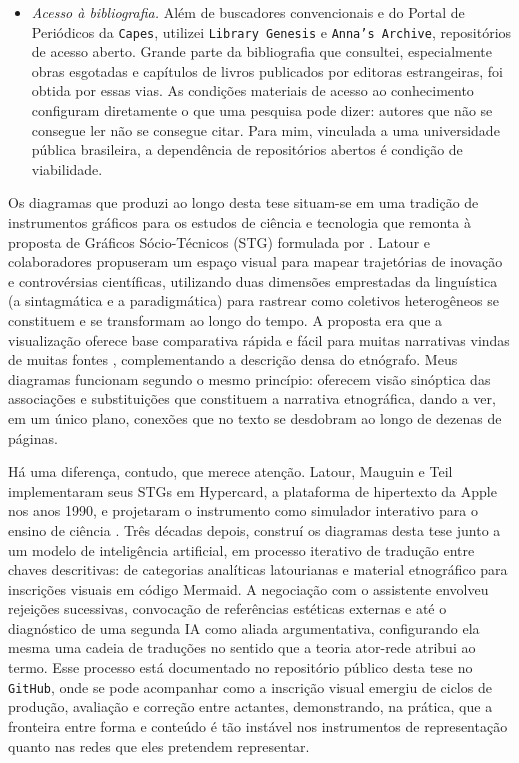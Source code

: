 \begin{itemize}
\item \textit{Acesso à bibliografia.} Além de buscadores convencionais e do Portal de Periódicos da \texttt{Capes}, utilizei \texttt{Library Genesis} e \texttt{Anna's Archive}, repositórios de acesso aberto. Grande parte da bibliografia que consultei, especialmente obras esgotadas e capítulos de livros publicados por editoras estrangeiras, foi obtida por essas vias. As condições materiais de acesso ao conhecimento configuram diretamente o que uma pesquisa pode dizer: autores que não se consegue ler não se consegue citar. Para mim, vinculada a uma universidade pública brasileira, a dependência de repositórios abertos é condição de viabilidade.

\end{itemize}

Os diagramas que produzi ao longo desta tese situam-se em uma tradição de instrumentos gráficos para os estudos de ciência e tecnologia que remonta à proposta de Gráficos Sócio-Técnicos (STG) formulada por \textcite{latour1992note}. Latour e colaboradores propuseram um espaço visual para mapear trajetórias de inovação e controvérsias científicas, utilizando duas dimensões emprestadas da linguística (a sintagmática e a paradigmática) para rastrear como coletivos heterogêneos se constituem e se transformam ao longo do tempo. A proposta era que a visualização oferece base comparativa rápida e fácil para muitas narrativas vindas de muitas fontes \parencite[p.~37]{LatourMauguinTeil1992}, complementando a descrição densa do etnógrafo. Meus diagramas funcionam segundo o mesmo princípio: oferecem visão sinóptica das associações e substituições que constituem a narrativa etnográfica, dando a ver, em um único plano, conexões que no texto se desdobram ao longo de dezenas de páginas.

Há uma diferença, contudo, que merece atenção. Latour, Mauguin e Teil implementaram seus STGs em Hypercard, a plataforma de hipertexto da Apple nos anos 1990, e projetaram o instrumento como simulador interativo para o ensino de ciência \parencite[p.~51]{LatourMauguinTeil1992}. Três décadas depois, construí os diagramas desta tese junto a um modelo de inteligência artificial, em processo iterativo de tradução entre chaves descritivas: de categorias analíticas latourianas e material etnográfico para inscrições visuais em código Mermaid. A negociação com o assistente envolveu rejeições sucessivas, convocação de referências estéticas externas e até o diagnóstico de uma segunda IA como aliada argumentativa, configurando ela mesma uma cadeia de traduções no sentido que a teoria ator-rede atribui ao termo. Esse processo está documentado no repositório público desta tese no \texttt{GitHub}, onde se pode acompanhar como a inscrição visual emergiu de ciclos de produção, avaliação e correção entre actantes, demonstrando, na prática, que a fronteira entre forma e conteúdo é tão instável nos instrumentos de representação quanto nas redes que eles pretendem representar.

